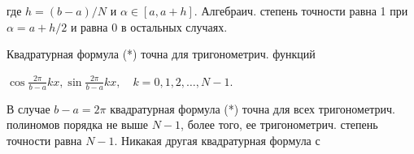 \documentclass[10pt]{article}
\begin{document}
где $h=(b-a) / N$ и $\alpha \in[a, a+h]$. Алгебраич. степень точности равна 1 при $\alpha=a+h / 2$ и равна 0 в остальных случаях.



Квадратурная формула (*) точна для тригонометрич. функций



$\cos \frac{2 \pi}{b-a} k x, \sin \frac{2 \pi}{b-a} k x, \quad k=0,1,2, \ldots, N-1$.



В случае $b-a=2 \pi$ квадратурная формула (*) точна для всех тригонометрич. полиномов порядка не выше $N-1$, более того, ее тригонометрич. степень точности равна $N-1$. Никакая другая квадратурная формула с
\end{document}
